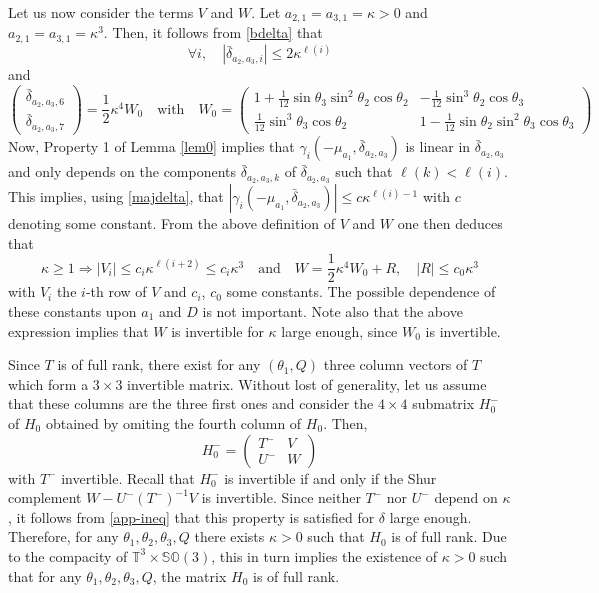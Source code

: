 \documentclass[a4paper,twoside]{article}
\def \TT {{\mathbb T}}
\def \finproof{\hfill\hbox{\vrule width1.0ex height1.5ex}}
\def \SO {{\mathbb S}{\mathbb O}}
\begin{document}
Let us now consider the terms $V$ and $W$. Let $a_{2,1}=a_{3,1} = \kappa>0$ and $a_{2,1}=a_{3,1} = \kappa^3$.
Then, it follows from \eqref{bdelta} that 
\begin{equation}
\label{majdelta}
\forall i, \quad |\bar \delta_{a_2,a_3,i}| \leq 2 \kappa^{\ell(i)} 
\end{equation}
and
\[
\begin{pmatrix}
\bar \delta_{a_2,a_3,6} \\
\bar \delta_{a_2,a_3,7}
\end{pmatrix}
=
\frac{1}{2} \kappa^4 W_0 \quad \text{with} \quad 
W_0= 
\begin{pmatrix}
1+ \frac{1}{12} \sin \theta_3 \sin^2 \theta_2 \cos \theta_2 & -\frac{1}{12} \sin^3 \theta_2 \cos \theta_3 \\
\frac{1}{12} \sin^3 \theta_3 \cos \theta_2 & 1 -\frac{1}{12} \sin \theta_2 \sin^2 \theta_3 \cos \theta_3
\end{pmatrix}
\]
Now, Property 1 of Lemma \ref{lem0} implies that $\gamma_i(-\mu_{a_1}, \bar \delta_{a_2,a_3})$ is linear in 
$\bar \delta_{a_2,a_3}$ and only depends on the components $\bar \delta_{a_2,a_3,k}$ of  $\bar \delta_{a_2,a_3}$ such
that $\ell(k) < \ell(i)$. This implies, using \eqref{majdelta}, that 
$|\gamma_i(-\mu_{a_1}, \bar \delta_{a_2,a_3})| \leq c \kappa^{\ell(i)-1}$ with $c$ denoting some constant. From 
the above definition of $V$ and $W$ one then deduces that 
\begin{equation}
\label{app-ineq}
\kappa \geq 1 \Longrightarrow 
|V_i| \leq c_i \kappa^{\ell(i+2)}  \leq c_i \kappa^3 \quad \text{and} \quad 
W= \frac{1}{2} \kappa^4 W_0 + R,\quad  |R| \leq c_0 \kappa^3
\end{equation}
with $V_i$ the $i$-th row of $V$ and $c_i$, $c_0$ some constants. The possible dependence of
these constants upon $a_1$ and $D$ is not important. Note also that the 
above expression implies that $W$ is invertible for $\kappa$ large enough, since $W_0$ is invertible.

Since $T$ is of full rank, there exist for any $(\theta_1,Q)$ three column vectors of $T$ which form a
$3 \times 3$ invertible matrix. Without lost of generality, let us assume that these columns are the 
three first ones and consider the $4 \times 4$ submatrix $H_0^-$ of $H_0$ obtained by 
omiting the fourth column of $H_0$. Then,
\[
H_0^-=
\begin{pmatrix}
T^- & V \\
U^- & W
\end{pmatrix}
\]
with $T^-$ invertible. Recall that $H_0^-$ is invertible if and only if the Shur complement $W- U^- (T^-)^{-1} V$ is invertible.
Since neither $T^-$ nor $U^-$ depend on $\kappa$, it follows from \eqref{app-ineq} that this property is satisfied 
for $\delta$ large enough. Therefore, for any $\theta_1, \theta_2, \theta_3,Q$ there exists $\kappa>0$ such that 
$H_0$ is of full rank. Due to the compacity of $\TT^3 \times \SO(3)$, this in turn implies the existence of 
$\kappa>0$ such that for any  $\theta_1, \theta_2, \theta_3,Q$, the matrix $H_0$ is of full rank. \finproof
\vspace{.3cm}
\end{document}
